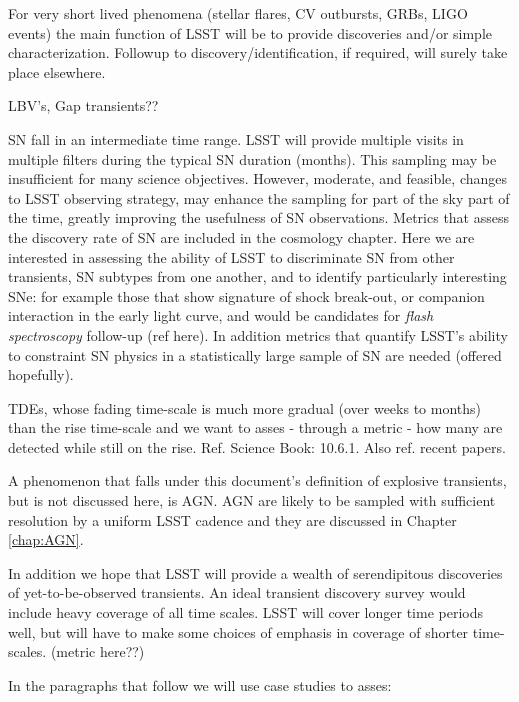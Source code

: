 For very short lived phenomena (stellar flares, CV outbursts, GRBs,
LIGO events) the main function of LSST will be to provide discoveries
and/or simple characterization.  Followup to discovery/identification,
if required, will surely take place elsewhere.

LBV's, Gap transients??

SN fall in an intermediate time range.  LSST will provide
multiple visits in multiple filters during the typical SN duration
(months).  This sampling may be insufficient for many science
objectives.  However, moderate, and feasible, changes to LSST
observing strategy, may enhance the sampling for part of the sky part
of the time, greatly improving the usefulness of SN observations. 
Metrics that assess the discovery rate of SN are included in the
cosmology chapter. Here we are interested in assessing the ability of
LSST to discriminate SN from other transients, SN subtypes from one
another, and to identify particularly interesting SNe: for example
those that show signature of shock break-out, or companion interaction
in the early light curve, and would be candidates for \emph{flash
  spectroscopy} follow-up (ref here). In addition metrics that
quantify LSST's ability to constraint SN physics in a statistically
large sample of SN are needed (offered hopefully).


TDEs, whose fading time-scale is much more gradual
(over weeks to months) than the rise time-scale and we want to asses -
through a metric - how many are detected while still on the
rise. Ref. Science Book: 10.6.1. Also ref. recent papers.

A phenomenon that falls under this document's definition of explosive
transients, but is not discussed here, is AGN. AGN are likely to be
sampled with sufficient resolution by a uniform LSST cadence and they
are discussed in Chapter \ref{chap:AGN}.

In addition we hope that LSST will provide a wealth of serendipitous
discoveries of yet-to-be-observed transients.  An ideal transient
discovery survey would include heavy coverage of all time scales. LSST
will cover longer time periods well, but will have to make some
choices of emphasis in coverage of shorter time-scales. (metric
here??)


In the paragraphs that follow we will use case studies to asses:

